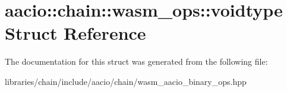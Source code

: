 \hypertarget{structaacio_1_1chain_1_1wasm__ops_1_1voidtype}{}\section{aacio\+:\+:chain\+:\+:wasm\+\_\+ops\+:\+:voidtype Struct Reference}
\label{structaacio_1_1chain_1_1wasm__ops_1_1voidtype}


The documentation for this struct was generated from the following file\+:\begin{DoxyCompactItemize}
\item 
libraries/chain/include/aacio/chain/wasm\+\_\+aacio\+\_\+binary\+\_\+ops.\+hpp\end{DoxyCompactItemize}
